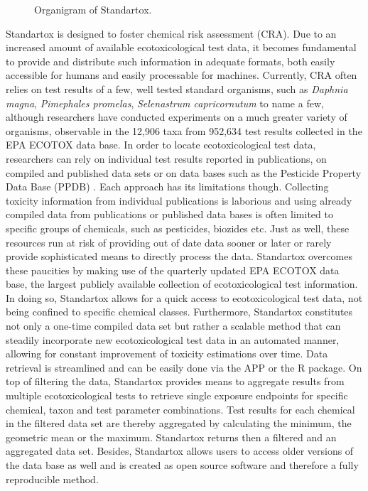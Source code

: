 \pagebreak


\pagebreak

\begin{figure}
    
    \caption{Organigram of Standartox.}
    \label{fig:stx-organigram}
\end{figure}
\pagebreak


\pagebreak


\pagebreak

Standartox is designed to foster chemical risk assessment (CRA). Due to an increased amount of available ecotoxicological test data, it becomes fundamental to provide and distribute such information in adequate formats, both easily accessible for humans and easily processable for machines. Currently, CRA often relies on test results of a few, well tested standard organisms, such as \textit{Daphnia magna}, \textit{Pimephales promelas}, \textit{Selenastrum capricornutum} to name a few, although researchers have conducted experiments on a much greater variety of organisms, observable in the 12,906 taxa from 952,634 test results collected in the EPA ECOTOX data base. In order to locate ecotoxicological test data, researchers can rely on individual test results reported in publications, on compiled and published data sets \citep{malaj_organic_2014, morrissey_neonicotinoid_2015} or on data bases such as the Pesticide Property Data Base (PPDB) \citep{lewis_international_2016}. Each approach has its limitations though. Collecting toxicity information from individual publications is laborious and using already compiled data from publications or published data bases is often limited to specific groups of chemicals, such as pesticides, biozides etc. Just as well, these resources run at risk of providing out of date data sooner or later or rarely provide sophisticated means to directly process the data. Standartox overcomes these paucities by making use of the quarterly updated EPA ECOTOX data base, the largest publicly available collection of ecotoxicological test information. In doing so, Standartox allows for a quick access to ecotoxicological test data, not being confined to specific chemical classes. Furthermore, Standartox constitutes not only a one-time compiled data set but rather a scalable method that can steadily incorporate new ecotoxicological test data in an automated manner, allowing for constant improvement of toxicity estimations over time. Data retrieval is streamlined and can be easily done via the APP or the R package. On top of filtering the data, Standartox provides means to aggregate results from multiple ecotoxicological tests to retrieve single exposure endpoints for specific chemical, taxon and test parameter combinations. Test results for each chemical in the filtered data set are thereby aggregated by calculating the minimum, the geometric mean or the maximum. Standartox returns then a filtered and an aggregated data set. Besides, Standartox allows users to access older versions of the data base as well and is created as open source software and therefore a fully reproducible method.

